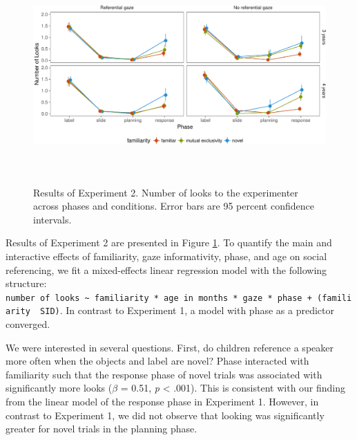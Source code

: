 \documentclass[10pt, letterpaper]{article}
\newenvironment{CodeChunk}{}{}
\begin{document}
\begin{CodeChunk}
\begin{figure}[h]

{\centering \includegraphics[width=6.5in,height=3.25in]{figs/results_e2-1} 

}

\caption[Results of Experiment 2]{Results of Experiment 2. Number of looks to the experimenter across phases and conditions. Error bars are 95 percent confidence intervals.}\label{fig:results_e2}
\end{figure}
\end{CodeChunk}

Results of Experiment 2 are presented in Figure \ref{fig:results_e2}. To
quantify the main and interactive effects of familiarity, gaze
informativity, phase, and age on social referencing, we fit a
mixed-effects linear regression model with the following structure:
\texttt{number\ of\ looks\ \textasciitilde{}\ familiarity\ *\ age\ in\ months\ *\ gaze\ *\ phase\ +\ (familiarity\ \textbar{}\ SID)}.
In contrast to Experiment 1, a model with phase as a predictor
converged.

We were interested in several questions. First, do children reference a
speaker more often when the objects and label are novel? Phase
interacted with familiarity such that the response phase of novel trials
was associated with significantly more looks (\(\beta\) = 0.51, \emph{p}
\textless{} .001). This is consistent with our finding from the linear
model of the response phase in Experiment 1. However, in contrast to
Experiment 1, we did not observe that looking was significantly greater
for novel trials in the planning phase.
\end{document}
